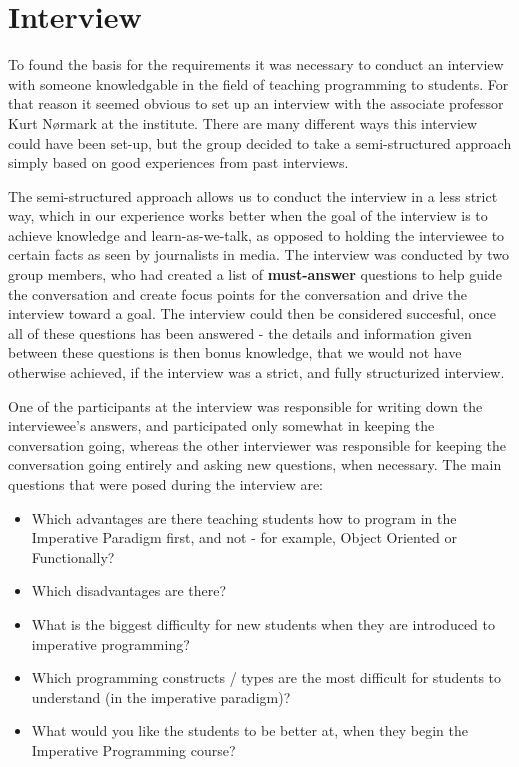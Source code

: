 \section{Interview}

To found the basis for the requirements it was necessary to conduct an interview with someone knowledgable in the field of teaching programming to students. For that reason it seemed obvious to set up an interview with the associate professor Kurt N{\o}rmark at the institute. There are many different ways this interview could have been set-up, but the group decided to take a semi-structured approach simply based on good experiences from past 
interviews. 


The semi-structured approach allows us to conduct the interview in a less strict way, which in our experience works better when the goal of the interview is to achieve knowledge and learn-as-we-talk, as opposed to holding the interviewee to certain facts as seen by journalists in media. The interview was conducted by two group members, who had created a list of \textbf{must-answer} questions to help guide the conversation and create focus points for the conversation and drive the interview toward a goal. The interview could then be considered succesful, once all of these questions has been answered - the details and information given between these questions is then bonus knowledge, that we would not have otherwise achieved, if the interview was a strict, and fully structurized interview.

One of the participants at the interview was responsible for writing down the interviewee's answers, and participated only somewhat in keeping the conversation going, whereas the other interviewer was responsible for keeping the conversation going entirely and asking new questions, when necessary. The main questions that were posed during the interview are:

\begin{itemize}
	\item {} Which advantages are there teaching students how to program in the Imperative Paradigm first, and not - for example, Object 
	Oriented or Functionally?
	\item Which disadvantages are there?
	\item What is the biggest difficulty for new students when they are introduced to imperative programming?
	\item Which programming constructs / types are the most difficult for students to understand (in the imperative paradigm)?
	\item What would you like the students to be better at, when they begin the Imperative Programming course?
\end{itemize}


